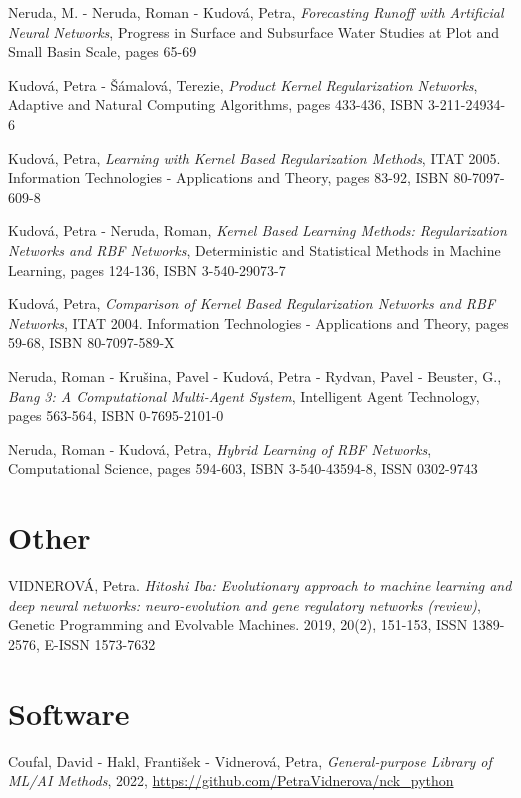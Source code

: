 \vspace{0.4em}
\noindent
Neruda, M. - Neruda, Roman - Kudová, Petra, {\em Forecasting Runoff with Artificial Neural Networks}, Progress in Surface and Subsurface Water Studies at Plot and Small Basin Scale, pages 65-69

\vspace{0.4em}
\noindent
Kudová, Petra - Šámalová, Terezie, {\em Product Kernel Regularization Networks}, Adaptive and Natural Computing Algorithms, pages 433-436, ISBN 3-211-24934-6

\vspace{0.4em}
\noindent
Kudová, Petra, {\em Learning with Kernel Based Regularization Methods}, ITAT 2005. Information Technologies - Applications and Theory, pages 83-92, ISBN 80-7097-609-8

\vspace{0.4em}
\noindent
Kudová, Petra - Neruda, Roman, {\em Kernel Based Learning Methods: Regularization Networks and RBF Networks}, Deterministic and Statistical Methods in Machine Learning, pages 124-136, ISBN 3-540-29073-7

\vspace{0.4em}
\noindent
Kudová, Petra, {\em Comparison of Kernel Based Regularization Networks and RBF Networks}, ITAT 2004. Information Technologies - Applications and Theory, pages 59-68, ISBN 80-7097-589-X

\vspace{0.4em}
\noindent
Neruda, Roman - Krušina, Pavel - Kudová, Petra - Rydvan, Pavel - Beuster, G., {\em Bang 3: A Computational Multi-Agent System}, Intelligent Agent Technology, pages 563-564, ISBN 0-7695-2101-0

\vspace{0.4em}
\noindent
Neruda, Roman - Kudová, Petra, {\em Hybrid Learning of RBF Networks}, Computational Science, pages 594-603, ISBN 3-540-43594-8, ISSN 0302-9743

\vspace{0.4em}
\noindent

\section{Other}
VIDNEROVÁ, Petra. {\em Hitoshi Iba: Evolutionary approach to machine learning and deep neural networks: neuro-evolution and gene regulatory networks (review)}, Genetic Programming and Evolvable Machines. 2019, 20(2), 151-153, ISSN 1389-2576, E-ISSN 1573-7632 

\section{Software}
Coufal, David - Hakl, František - Vidnerová, Petra, {\em General-purpose Library of ML/AI Methods}, 2022, \href{https://github.com/PetraVidnerova/nck_python}{https://github.com/PetraVidnerova/nck\_python}

